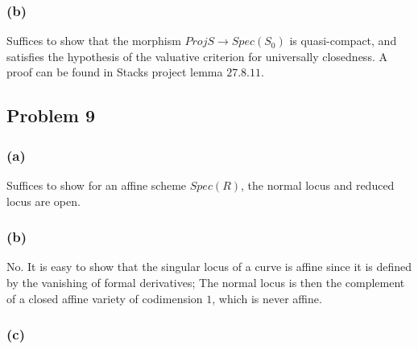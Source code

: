 \documentclass{article}
\theoremstyle{definition}
\theoremstyle{definition}
\theoremstyle{definition}
\theoremstyle{definition}
\theoremstyle{definition}
\theoremstyle{definition}
\theoremstyle{definition}
\begin{document}
\subsubsection*{(b)}
Suffices to show that the morphism $Proj S\to Spec(S_0)$ is quasi-compact, and satisfies the hypothesis of the valuative criterion for universally closedness. A proof can be found in Stacks project lemma $27.8.11$. 

\subsection*{Problem 9}
\subsubsection*{(a)}
Suffices to show for an affine scheme $Spec(R)$, the normal locus and reduced locus are open.
\subsubsection*{(b)}
No. It is easy to show that the singular locus of a curve is affine since it is defined by the vanishing of formal derivatives; The normal locus is then the complement of a closed affine variety of codimension $1$, which is never affine. 



\subsubsection*{(c)}
\end{document}
